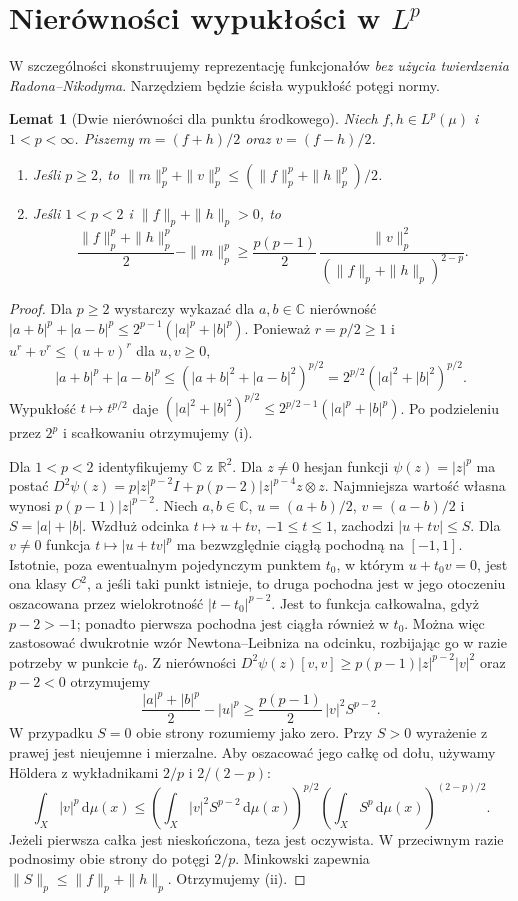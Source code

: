\documentclass[11pt,a4paper,oneside]{book}
\numberwithin{equation}{chapter}
\theoremstyle{plain}
\newtheorem{lemat}[twierdzenie]{Lemat}
\theoremstyle{definition}
\theoremstyle{remark}
\begin{document}
\section{Nierówności wypukłości w $L^p$}
W szczególności skonstruujemy reprezentację funkcjonałów
\emph{bez użycia twierdzenia Radona--Nikodyma}. Narzędziem
będzie ścisła wypukłość potęgi normy.

\begin{lemat}[Dwie nierówności dla punktu środkowego]
\label{lem:midpoint-lp-15}
Niech $f,h\in L^p(\mu)$ i $1<p<\infty$. Piszemy
$m=(f+h)/2$ oraz $v=(f-h)/2$.
\begin{enumerate}[label=\textup{(\roman*)}]
\item Jeśli $p\ge2$, to
$\|m\|_p^p+\|v\|_p^p\le(\|f\|_p^p+\|h\|_p^p)/2$.
\item Jeśli $1<p<2$ i $\|f\|_p+\|h\|_p>0$, to
\begin{equation}\label{eq:midpoint-low-15}
\frac{\|f\|_p^p+\|h\|_p^p}{2}-\|m\|_p^p
\ge \frac{p(p-1)}2\,
\frac{\|v\|_p^2}{(\|f\|_p+\|h\|_p)^{2-p}}.
\end{equation}
\end{enumerate}
\end{lemat}
\begin{proof}
Dla $p\ge2$ wystarczy wykazać dla $a,b\in\mathbb C$ nierówność
$|a+b|^p+|a-b|^p\le2^{p-1}(|a|^p+|b|^p)$.
Ponieważ $r=p/2\ge1$ i $u^r+v^r\le(u+v)^r$ dla $u,v\ge0$,
\[
|a+b|^p+|a-b|^p
\le (|a+b|^2+|a-b|^2)^{p/2}
=2^{p/2}(|a|^2+|b|^2)^{p/2}.
\]
Wypukłość $t\mapsto t^{p/2}$ daje
$(|a|^2+|b|^2)^{p/2}\le2^{p/2-1}(|a|^p+|b|^p)$.
Po podzieleniu przez $2^p$ i scałkowaniu otrzymujemy (i).

Dla $1<p<2$ identyfikujemy $\mathbb C$ z $\mathbb R^2$.
Dla $z\ne0$ hesjan funkcji $\psi(z)=|z|^p$ ma postać
$D^2\psi(z)=p|z|^{p-2}I+p(p-2)|z|^{p-4}z\otimes z$.
Najmniejsza wartość własna wynosi
$p(p-1)|z|^{p-2}$. Niech $a,b\in\mathbb C$,
$u=(a+b)/2$, $v=(a-b)/2$ i $S=|a|+|b|$.
Wzdłuż odcinka $t\mapsto u+tv$, $-1\le t\le1$,
zachodzi $|u+tv|\le S$. Dla $v\ne0$ funkcja
$t\mapsto |u+tv|^p$ ma bezwzględnie ciągłą pochodną
na $[-1,1]$. Istotnie, poza ewentualnym pojedynczym
punktem $t_0$, w którym $u+t_0v=0$, jest ona klasy $C^2$,
a jeśli taki punkt istnieje, to druga pochodna jest
w jego otoczeniu oszacowana przez wielokrotność
$|t-t_0|^{p-2}$. Jest to funkcja całkowalna, gdyż
$p-2>-1$; ponadto pierwsza pochodna jest ciągła
również w $t_0$. Można więc zastosować dwukrotnie
wzór Newtona--Leibniza na odcinku, rozbijając go
w razie potrzeby w punkcie $t_0$. Z nierówności
$D^2\psi(z)[v,v]\ge p(p-1)|z|^{p-2}|v|^2$
oraz $p-2<0$ otrzymujemy
\[
\frac{|a|^p+|b|^p}{2}-|u|^p
\ge \frac{p(p-1)}2\,|v|^2S^{p-2}.
\]
W przypadku $S=0$ obie strony rozumiemy jako zero.
Przy $S>0$ wyrażenie z prawej jest nieujemne i mierzalne.
Aby oszacować jego całkę od dołu, używamy Höldera
z wykładnikami $2/p$ i $2/(2-p)$:
\[
\int_X|v|^p\,\mathrm d\mu(x)
\le\left(\int_X |v|^2S^{p-2}\,\mathrm d\mu(x)\right)^{p/2}
\left(\int_XS^p\,\mathrm d\mu(x)\right)^{(2-p)/2}.
\]
Jeżeli pierwsza całka jest nieskończona, teza jest oczywista.
W przeciwnym razie podnosimy obie strony do potęgi $2/p$.
Minkowski zapewnia $\|S\|_p\le\|f\|_p+\|h\|_p$.
Otrzymujemy (ii).
\end{proof}
\end{document}
